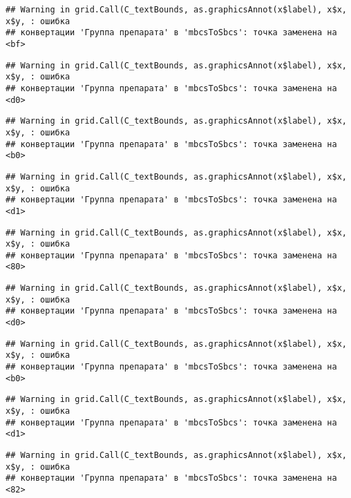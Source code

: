 \documentclass[
]{article}
\begin{document}
\begin{verbatim}
## Warning in grid.Call(C_textBounds, as.graphicsAnnot(x$label), x$x, x$y, : ошибка
## конвертации 'Группа препарата' в 'mbcsToSbcs': точка заменена на <bf>
\end{verbatim}

\begin{verbatim}
## Warning in grid.Call(C_textBounds, as.graphicsAnnot(x$label), x$x, x$y, : ошибка
## конвертации 'Группа препарата' в 'mbcsToSbcs': точка заменена на <d0>
\end{verbatim}

\begin{verbatim}
## Warning in grid.Call(C_textBounds, as.graphicsAnnot(x$label), x$x, x$y, : ошибка
## конвертации 'Группа препарата' в 'mbcsToSbcs': точка заменена на <b0>
\end{verbatim}

\begin{verbatim}
## Warning in grid.Call(C_textBounds, as.graphicsAnnot(x$label), x$x, x$y, : ошибка
## конвертации 'Группа препарата' в 'mbcsToSbcs': точка заменена на <d1>
\end{verbatim}

\begin{verbatim}
## Warning in grid.Call(C_textBounds, as.graphicsAnnot(x$label), x$x, x$y, : ошибка
## конвертации 'Группа препарата' в 'mbcsToSbcs': точка заменена на <80>
\end{verbatim}

\begin{verbatim}
## Warning in grid.Call(C_textBounds, as.graphicsAnnot(x$label), x$x, x$y, : ошибка
## конвертации 'Группа препарата' в 'mbcsToSbcs': точка заменена на <d0>
\end{verbatim}

\begin{verbatim}
## Warning in grid.Call(C_textBounds, as.graphicsAnnot(x$label), x$x, x$y, : ошибка
## конвертации 'Группа препарата' в 'mbcsToSbcs': точка заменена на <b0>
\end{verbatim}

\begin{verbatim}
## Warning in grid.Call(C_textBounds, as.graphicsAnnot(x$label), x$x, x$y, : ошибка
## конвертации 'Группа препарата' в 'mbcsToSbcs': точка заменена на <d1>
\end{verbatim}

\begin{verbatim}
## Warning in grid.Call(C_textBounds, as.graphicsAnnot(x$label), x$x, x$y, : ошибка
## конвертации 'Группа препарата' в 'mbcsToSbcs': точка заменена на <82>
\end{verbatim}
\end{document}
